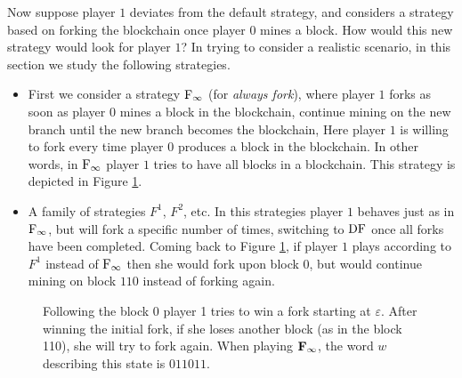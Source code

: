 Now suppose player $1$ deviates from the default strategy, and considers a strategy based on forking the blockchain once player $0$ mines a block. 
How would this new strategy would look for player $1$? In trying to consider a realistic scenario, in this section we study the following strategies. 


\begin{itemize}
\item First we consider a strategy ${\rm {F_\infty}}$ (for \emph{always fork}), where player $1$ forks as soon as player $0$ mines a block in the blockchain, continue mining on the new branch until the new branch becomes the blockchain, Here player $1$ is willing to fork every time player $0$ produces a block in the blockchain. In other words, 
in ${\rm {F_\infty}}$ player $1$ tries to have all blocks in a blockchain. This strategy is depicted in Figure \ref{fig:always_fork}.
\item A family of strategies $F^1$, $F^2$, etc. In this strategies player $1$ behaves just as in ${\rm {F_\infty}}$, but will fork a specific number of times, switching to $\text{\rm DF}$ once 
all forks have been completed. Coming back to Figure \ref{fig:always_fork}, if player $1$ plays according to $F^1$ instead of ${\rm {F_\infty}}$ then she would fork upon block $0$, but 
would continue mining on block $110$ instead of forking again. 
\end{itemize}

\begin{figure}
\begin{center}
\end{center}
\caption{Following the block 0 player 1 tries to win a fork starting at $\varepsilon$. After winning the initial fork, if she loses another block (as in the block 110), she will try to fork again. When playing ${\rm {\bf F_\infty}}$, the word $w$ describing this state is $011011$.}
\label{fig:always_fork}
\end{figure}

